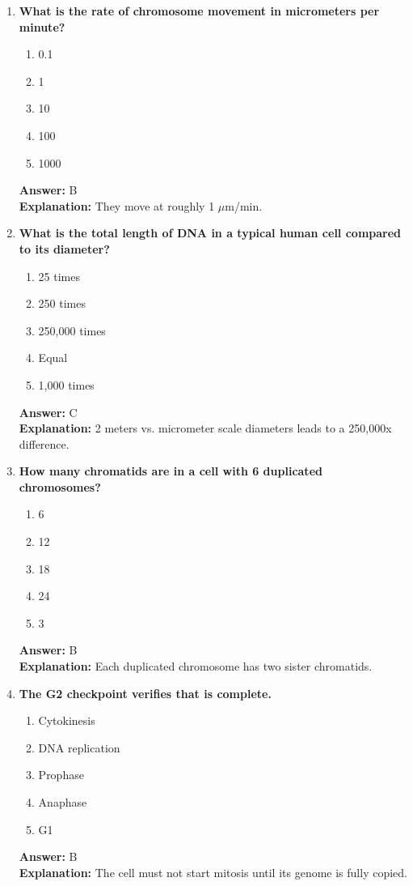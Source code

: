 \documentclass[11pt, a4paper]{article}
\begin{document}
\begin{enumerate}[leftmargin=*, label=\arabic*.]
\item \textbf{What is the rate of chromosome movement in micrometers per minute?}
\begin{enumerate}[label=\Alph*.]
\item 0.1
\item 1
\item 10
\item 100
\item 1000
\end{enumerate}
\textbf{Answer:} B \\
\textbf{Explanation:} They move at roughly 1 $\mu$m/min.

\item \textbf{What is the total length of DNA in a typical human cell compared to its diameter?}
\begin{enumerate}[label=\Alph*.]
\item 25 times
\item 250 times
\item 250,000 times
\item Equal
\item 1,000 times
\end{enumerate}
\textbf{Answer:} C \\
\textbf{Explanation:} 2 meters vs. micrometer scale diameters leads to a 250,000x difference.

\item \textbf{How many chromatids are in a cell with 6 duplicated chromosomes?}
\begin{enumerate}[label=\Alph*.]
\item 6
\item 12
\item 18
\item 24
\item 3
\end{enumerate}
\textbf{Answer:} B \\
\textbf{Explanation:} Each duplicated chromosome has two sister chromatids.

\item \textbf{The G2 checkpoint verifies that \underline{\hspace{1cm}} is complete.}
\begin{enumerate}[label=\Alph*.]
\item Cytokinesis
\item DNA replication
\item Prophase
\item Anaphase
\item G1
\end{enumerate}
\textbf{Answer:} B \\
\textbf{Explanation:} The cell must not start mitosis until its genome is fully copied.


\end{enumerate}
\end{document}
